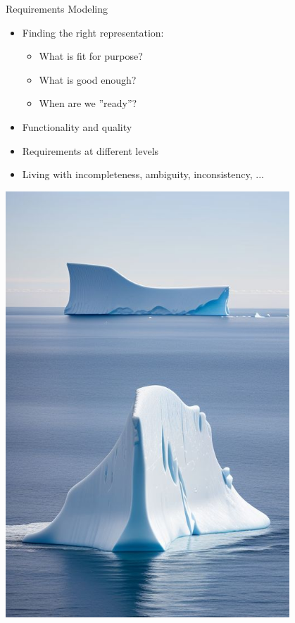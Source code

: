 \documentclass{simpleslides}
\begin{document}
\begin{frame}[fragile]{Requirements Modeling}
\begin{minipage}[t]{0.6\textwidth}
\vspace{0pt}
\begin{itemize}
\item Finding the right representation:
\begin{itemize}
\item What is fit for purpose?
\item What is good enough?
\item When are we ''ready''?
\end{itemize}
\item Functionality and quality
\item Requirements at different levels
\item Living with incompleteness, ambiguity, inconsistency, ...
\end{itemize}
\end{minipage}%
\begin{minipage}[t]{0.4\textwidth}
\vspace{0pt}
\hfill\includegraphics[width=0.8\textwidth]{img/iceberg4}
\end{minipage}%
\end{frame}
\end{document}
